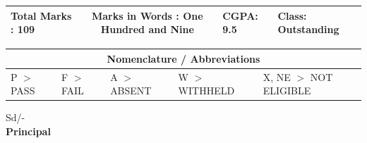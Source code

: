\documentclass[a4paper,12pt]{article}
\begin{document}
\begin{center}
\begin{tabular}{|m{3cm}|m{6cm}|m{3cm}|m{2cm}|m{4cm}|}
\hline
    \textbf{Total Marks} : 109 & \multicolumn{2}{|c|}{\textbf{Marks in Words} : One Hundred and Nine} & \textbf{CGPA}: 9.5 & \textbf{Class}: Outstanding \\
\hline
\end{tabular}
\end{center}

\begin{center}
\begin{tabular}{|m{3cm}|m{3cm}|m{3cm}|m{3cm}|m{4cm}|}
\hline
\multicolumn{5}{|c|}{\textbf{Nomenclature / Abbreviations}} \\
\hline
P $>$ PASS & F $>$ FAIL & A $>$ ABSENT & W $>$ WITHHELD & X, NE $>$ NOT ELIGIBLE \\
\hline
\end{tabular}
\end{center}

\vspace{3cm}
\begin{flushright}
    Sd/- \\
    \textbf{Principal}
\end{flushright}

\vspace{0.5cm}
\noindent
\vfill
\end{document}
